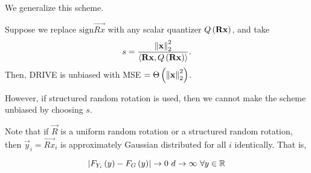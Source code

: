 \documentclass[twoside]{article}
\begin{document}
We generalize this scheme.

\begin{claim}
    Suppose we replace \(\mathrm{sign}\vec{Rx}\) with any scalar quantizer
    \(Q\left(\boldsymbol{\mathbf{Rx}}\right)\), and take
    \begin{equation}
        s = \frac{\left\lVert\boldsymbol{\mathbf{x}}\right\rVert_2^2}{\langle\boldsymbol{\mathbf{Rx}},Q\left(\boldsymbol{\mathbf{Rx}}\right)\rangle}.
        \label{eq:sq-def}
    \end{equation}
    Then, DRIVE is unbiased with MSE \( = \Theta\left(\left\lVert\boldsymbol{\mathbf{x}}\right\rVert_2^2\right)\).
\end{claim}

However, if structured random rotation is used, then we cannot make the scheme
unbiased by choosing \(s\).

Note that if \(\vec{R}\) is a uniform random rotation or a structured random
rotation, then \(\vec{y}_i = \vec{Rx}_i\) is approximately Gaussian distributed
for all \(i\) identically. That is,

\begin{equation}
    \abs{F_{Y_i}\brak{y}-F_G\brak{y}} \to 0\ d \to \infty\ \forall y \in \bR
\end{equation}
\end{document}
